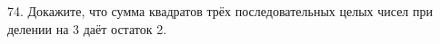 74. Докажите, что сумма квадратов трёх последовательных целых чисел при делении на 3 даёт остаток 2.\\

